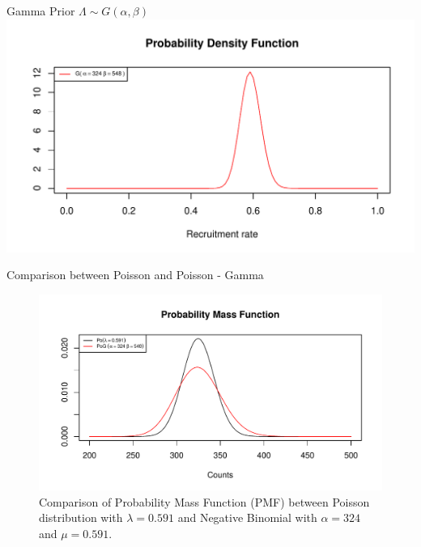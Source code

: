 \documentclass[english]{beamer}\usepackage[]{graphicx}\usepackage[]{xcolor}
\makeatletter
\def\maxwidth{ %
  \ifdim\Gin@nat@width>\linewidth
    \linewidth
  \else
    \Gin@nat@width
  \fi
}
\newenvironment{knitrout}{}{} %
\makeatother
\begin{document}
\begin{frame}{Gamma Prior}
$\Lambda \sim G(\alpha,\beta)$
\begin{knitrout}
\color{fgcolor}
\includegraphics[width=\maxwidth]{figures/figunnamed-chunk-8-1} 
\end{knitrout}

\end{frame}


\begin{frame}{Comparison between Poisson and Poisson - Gamma}
\begin{figure}
\begin{knitrout}
\color{fgcolor}
\includegraphics[width=\maxwidth]{figures/figunnamed-chunk-9-1} 
\end{knitrout}
  \caption{Comparison of Probability Mass Function (PMF) between Poisson distribution with $\lambda = 0.591$ and Negative Binomial with $\alpha = 324$ and $\mu = 0.591$.}
  \label{fig:2_6}
\end{figure}
\end{frame}
\end{document}
